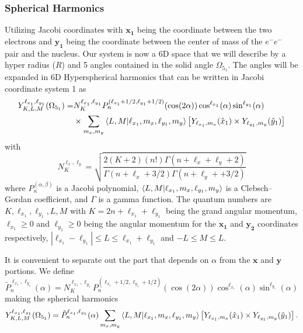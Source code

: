 
\subsubsection{Spherical Harmonics} %
\label{ssub:spherical_harmonics}
Utilizing Jacobi coordinates with $\mathbf{x_1}$ being the coordinate between the two electrons and $\mathbf{y_1}$ being the coordinate between the center of mass of the $e^-e^-$ pair and the nucleus. Our system is now a 6D space that we will describe by a hyper radius ($R$) and 5 angles contained in the solid angle $\Omega_{5_1}$. The angles will be expanded in 6D Hyperspherical harmonics that can be written in Jacobi coordinate system 1 as
\begin{align}
    Y^{\ell_{x_1},\ell_{y_1}}_{K,L,M}(\Omega_{5_1}) =& N^{\ell_{x_1},\ell_{y_1}}_K P_n^{(\ell_{x_1}+1/2,\ell_{y_1}+1/2)}(\cos(2\alpha)) \cos^{\ell_{x_1}}(\alpha) \sin^{\ell_{y_1}}(\alpha) \\ 
    &\times\sum_{m_x,m_y}\bra{L,M}\ket{\ell_{x_1},m_x,\ell_{y_1},m_y}  \left[Y_{\ell_{x_1},m_x}(\hat{x}_1)\times Y_{\ell_{y_1},m_y}(\hat{y}_1)\right]
\end{align}
with
\begin{equation}
    N^{\ell_x,\ell_y}_K = \sqrt{\frac{2(K+2)(n!)\Gamma (n+\ell_x+\ell_y+2)}{\Gamma (n+\ell_x+3/2) \Gamma (n+\ell_y++3/2)}}
\end{equation}
where $P_n^{(\alpha,\beta)}$ is a Jacobi polynomial, $\bra{L,M}\ket{\ell_{x_1},m_x,\ell_{y_1},m_y}$ is a Clebsch–Gordan coefficient, and $\Gamma$ is a gamma function. 
The quantum numbers are $K,\ell_{x_1},\ell_{y_1},L,M$ with $K=2n+\ell_{x_1}+\ell_{y_1}$ being the grand angular momentum, $\ell_{x_1}\ge0$ and $\ell_{y_1}\ge0$ being the angular momentum for the $\mathbf{x_1}$ and $\mathbf{y_2}$ coordinates respectively, $|\ell_{x_1}-\ell_{y_1}|\le L \le \ell_{x_1}+\ell_{y_1}$ and $-L \le M \le L$.

It is convenient to separate out the part that depends on $\alpha$ from the $\mathbf{x}$ and $\mathbf{y}$ portions. We define
\begin{equation}
    \tilde{P}^{\ell_{x_1},\ell_{y_1}}_{n}(\alpha) = N^{\ell_{x_1},\ell_{y_1}}_K P_n^{(\ell_{x_1}+1/2,\ell_{y_1}+1/2)}(\cos(2\alpha)) \cos^{\ell_{x_1}}(\alpha) \sin^{\ell_{y_1}}(\alpha) 
\end{equation}
making the spherical harmonics 
\begin{equation}
    Y^{\ell_{x_1},\ell_{y_1}}_{K,L,M}(\Omega_{5_1}) =\tilde{P}^{\ell_{x_1},\ell_{y_1}}_{n}(\alpha)\sum_{m_x,m_y}\bra{L,M}\ket{\ell_{x_1},m_x,\ell_{y_1},m_y}  \left[Y_{\ell_{x_1},m_x}(\hat{x}_1)\times Y_{\ell_{y_1},m_y}(\hat{y}_1)\right].
\end{equation}

